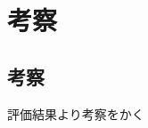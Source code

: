\chapter{考察}
\thispagestyle{fancy}

\section{考察}
評価結果より考察をかく



\begin{comment}
今後の課題としては，多くのサンプル画像で学習したカスケード分類器を用いる手法や，
ユーザの位置情報を常に保持しておき，視野から消失後に再認識された人物が消失時の位置に近い位置に存在した
場合，消失した人物として再認識させる手法の実装などで，
よりユーザを楽しませるプロジェクションマッピングの実装が挙げられる．
\end{comment}